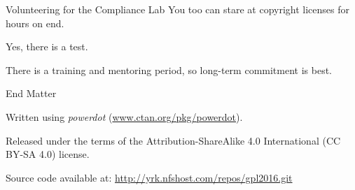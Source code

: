 \documentclass[
  size=12pt,
  style=simple,
  paper=screen
]{powerdot}
\begin{document}
\begin{wideslide}{Volunteering for the Compliance Lab}
  You too can stare at copyright licenses for hours on end.
  \pp

  \begin{itemize}
    \setlength{\itemsep}{1em}

    \nitem Yes, there is a test.

    \pp

    \nitem There is a training and mentoring period, so long-term
    commitment is best.

  \end{itemize}
\end{wideslide}

\begin{wideslide}{End Matter}
  \begin{itemize}
    \setlength{\itemsep}{1em}

    \sitem Written using \emph{powerdot}
    (\url{www.ctan.org/pkg/powerdot}).

    \sitem Released under the terms of the Attribution-ShareAlike 4.0
    International (CC BY-SA 4.0) license.

    \sitem Source code available at: \url{http://yrk.nfshost.com/repos/gpl2016.git}

  \end{itemize}
\end{wideslide}
\end{document}
